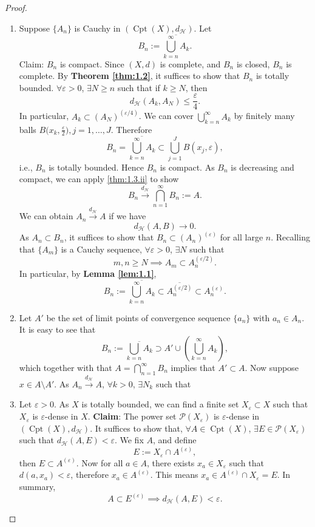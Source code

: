 \begin{proof}
\begin{enumerate}[label=(\roman*)]
    \item Suppose $\{ A_{n} \}$ is Cauchy in $(\operatorname{Cpt}(X),d_{\mathcal{H}})$. Let 
    \[B_{n}:=\overline{\bigcup _{k=n}^{\infty}A_{k}}.\]
    Claim: $B_{n}$ is compact.
    Since $(X,d)$ is complete, and $B_{n}$ is closed, $B_{n}$ is complete. 
    By \textbf{Theorem \ref{thm:1.2}}, it suffices to show that $B_{n}$ is totally bounded. 
    $\forall \varepsilon>0$, $\exists N\geq n$ such that if $k\geq N$, then 
    \[d_{\mathcal{H}}(A_{k},A_{N})\leq \frac{\varepsilon}{4}.\]
    In particular, $A_{k}\subset(A_{N})^{(\varepsilon/4)}$. 
    We can cover $\displaystyle \bigcup _{k=n}^{\infty}A_{k}$ by finitely many balls $B\big( x_{k}, \frac{\varepsilon}{2} \big),j=1,\dots,J$. Therefore 
    \[B_{n}=\overline{\bigcup _{k=n}^{\infty}A_{k}}\subset \bigcup _{j=1}^{J}B(x_{j},\varepsilon),\]
    i.e., $B_{n}$ is totally bounded. Hence $B_{n}$ is compact.
    As $B_{n}$ is decreasing and compact, we can apply \ref{thm:1.3.ii} to show 
    \[B_{n}\xrightarrow{d_{\mathcal{H}}}\bigcap _{n=1}^{\infty}B_{n}:=A.\] 
    We can obtain $A_{n}\xrightarrow{d_{\mathcal{H}}}A$ if we have 
    \[d_{\mathcal{H}}(A,B)\to 0.\] 
    As $A_{n}\subset B_{n}$, it suffices to show that $B_{n}\subset (A_{n})^{(\varepsilon)}$ for all large $n$. Recalling that $\{ A_{m} \}$ is a Cauchy sequence, $\forall \varepsilon>0$, $\exists N$ such that 
    \[m,n\geq N\implies A_{m}\subset A_{n}^{(\varepsilon/2)}.\]
    In particular, by \textbf{Lemma \ref{lem:1.1}}, 
    \[B_{n}:= \overline{\bigcup _{k=n}^{\infty}A_{k}}\subset\overline{A_{n}^{(\varepsilon/2)}}\subset A_{n}^{(\varepsilon)}.\]
   
    \item Let $A'$ be the set of limit points of convergence sequence $\{ a_{n} \}$ with $a_{n}\in A_{n}$. It is easy to see that 
    \[B_{n}:= \overline{\bigcup _{k=n}A_{k}}\supset A' \cup\left( \bigcup _{k=n}^{\infty}A_{k} \right),\]
    which together with that $\displaystyle A= \bigcap _{n=1}^{\infty}B_{n}$ implies that $A'\subset A$. 
    Now suppose $x \in A\setminus A'$. As $A_{n}\xrightarrow{d_{\mathcal{H}}}A$, $\forall k>0$, $\exists N_{k}$ such that 
   
    \item Let $\varepsilon>0$. As $X$ is totally bounded, we can find a finite set $X_{\varepsilon}\subset X$ such that $X_{\varepsilon}$ is $\varepsilon$-dense in $X$.
    \textbf{Claim}: The power set $\mathcal{P}(X_{\varepsilon})$ is $\varepsilon$-dense in $(\operatorname{Cpt}(X),d_{\mathcal{H}})$.
    It suffices to show that, $\forall A \in \operatorname{Cpt}(X)$, $\exists E \in \mathcal{P}(X_{\varepsilon})$ such that $d_{\mathcal{H}}(A,E)<\varepsilon$. We fix $A$, and define 
    \[E:=X_{\varepsilon}\cap A^{(\varepsilon)},\]
    then $E \subset A^{(\varepsilon)}$. Now for all $a \in A$, there exists $x_{a}\in X_{\varepsilon}$ such that $d(a,x_{a})<\varepsilon$, therefore $x_{a}\in A^{(\varepsilon)}$. 
    This means $x_{a} \in A^{(\varepsilon)}\cap X_{\varepsilon}=E$. In summary, 
    \[A\subset E^{(\varepsilon)}\implies d_{\mathcal{H}}(A,E)<\varepsilon.\]
   

\end{enumerate}
\end{proof}
